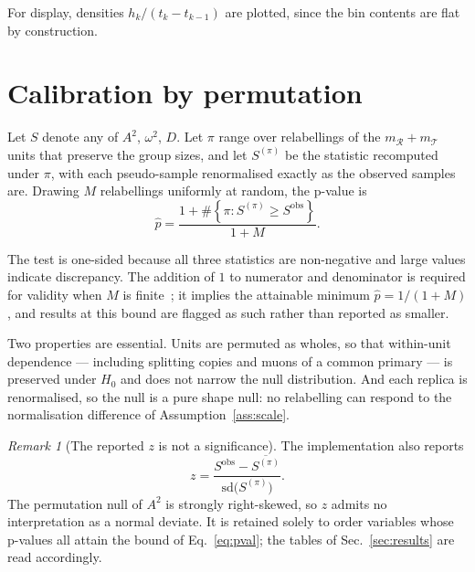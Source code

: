 \documentclass[11pt,a4paper]{article}
\theoremstyle{definition}
\theoremstyle{plain}
\theoremstyle{remark}
\newtheorem{remark}{Remark}[section]
\newcommand{\Rr}{\mathcal{R}}
\newcommand{\Tt}{\mathcal{T}}
\begin{document}
For display, densities $h_k / (t_k - t_{k-1})$ are plotted, since the bin
contents are flat by construction.

\section{Calibration by permutation}
\label{sec:perm}

Let $S$ denote any of $A^2$, $\omega^2$, $D$. Let $\pi$ range over relabellings
of the $m_\Rr + m_\Tt$ units that preserve the group sizes, and let $S^{(\pi)}$
be the statistic recomputed under $\pi$, with each pseudo-sample renormalised
exactly as the observed samples are. Drawing $M$ relabellings uniformly at
random, the p-value is
\begin{equation}
  \hat{p} = \frac{1 + \#\left\{\pi : S^{(\pi)} \ge S^{\mathrm{obs}}\right\}}{1+M}.
  \label{eq:pval}
\end{equation}

The test is one-sided because all three statistics are non-negative and large
values indicate discrepancy. The addition of $1$ to numerator and denominator is
required for validity when $M$ is finite~\cite{PhipsonSmyth2010}; it implies the
attainable minimum $\hat{p} = 1/(1+M)$, and results at this bound are flagged as
such rather than reported as smaller.

Two properties are essential. Units are permuted as wholes, so that within-unit
dependence --- including splitting copies and muons of a common primary --- is
preserved under $H_0$ and does not narrow the null distribution. And each
replica is renormalised, so the null is a pure shape null: no relabelling can
respond to the normalisation difference of Assumption~\ref{ass:scale}.

\begin{remark}[The reported $z$ is not a significance]
\label{rem:z}
The implementation also reports
\begin{equation*}
  z = \frac{S^{\mathrm{obs}} - \overline{S^{(\pi)}}}
           {\mathrm{sd}\bigl(S^{(\pi)}\bigr)} .
\end{equation*}
The permutation null of $A^2$ is strongly
right-skewed, so $z$ admits no interpretation as a normal deviate. It is
retained solely to order variables whose p-values all attain the bound of
Eq.~\eqref{eq:pval}; the tables of Sec.~\ref{sec:results} are read accordingly.
\end{remark}
\end{document}
